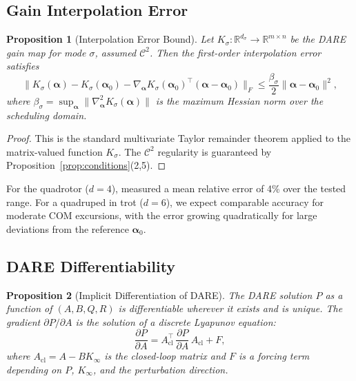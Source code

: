 \documentclass[letterpaper, 10pt, conference]{IEEEtran}
\newtheorem{proposition}{Proposition}
\newcommand{\R}{\mathbb{R}}
\newcommand{\balpha}{\bm{\alpha}}
\begin{document}
\subsection{Gain Interpolation Error}\label{sec:interp}

\begin{proposition}[Interpolation Error Bound]
\label{prop:interp_error}
Let $K_\sigma : \R^{d_\sigma} \to \R^{m \times n}$ be
the DARE gain map for mode $\sigma$, assumed $\mathcal{C}^2$.
Then the first-order interpolation error satisfies
\begin{equation}\label{eq:taylor_bound}
  \bigl\| K_\sigma(\balpha) - K_\sigma(\balpha_0)
    - \nabla_{\!\balpha} K_\sigma(\balpha_0)^\top
      (\balpha - \balpha_0)
  \bigr\|_F
  \leq \frac{\beta_\sigma}{2}
    \|\balpha - \balpha_0\|^2,
\end{equation}
where $\beta_\sigma = \sup_{\balpha}
\|\nabla^2_{\!\balpha} K_\sigma(\balpha)\|$ is the
maximum Hessian norm over the scheduling domain.
\end{proposition}

\begin{proof}
This is the standard multivariate Taylor remainder theorem
applied to the matrix-valued function $K_\sigma$.
The $\mathcal{C}^2$ regularity is guaranteed by
Proposition~\ref{prop:conditions}(2,5).
\end{proof}

For the quadrotor ($d=4$), \cite{zhang2025flat} measured
a mean relative error of 4\% over the tested range.
For a quadruped in trot ($d=6$), we expect comparable accuracy
for moderate COM excursions, with the error growing quadratically
for large deviations from the reference $\balpha_0$.

\subsection{DARE Differentiability}\label{sec:dare_diff}

\begin{proposition}[Implicit Differentiation of DARE]
\label{prop:dare_diff}
The DARE solution $P$ as a function of $(A, B, Q, R)$
is differentiable wherever it exists and is unique.
The gradient $\partial P / \partial A$ is the solution of
a discrete Lyapunov equation:
\begin{equation}\label{eq:lyap}
  \frac{\partial P}{\partial A}
  = A_{\mathrm{cl}}^\top \, \frac{\partial P}{\partial A}
    \, A_{\mathrm{cl}} + F,
\end{equation}
where $A_{\mathrm{cl}} = A - B K_\infty$ is the closed-loop
matrix and $F$ is a forcing term depending on $P$, $K_\infty$,
and the perturbation direction.
\end{proposition}
\end{document}
